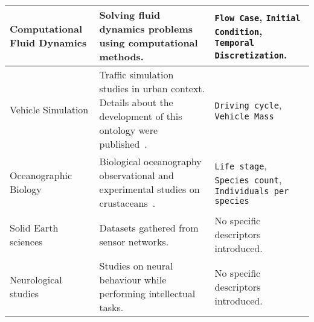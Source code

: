 \begin{table*}
\begin{tabular}{|p{}|p{}|p{}|}
Computational Fluid Dynamics    & Solving fluid dynamics problems using computational methods.                                                        & \texttt{Flow Case}, \texttt{Initial Condition}, \texttt{Temporal Discretization}.                                                                       \\ \hline
Vehicle Simulation              & Traffic simulation studies in urban context. Details about the development of this ontology were published~\cite{AguiarCastro2015}.                                                                        & \texttt{Driving cycle}, \texttt{Vehicle Mass}                                                                                                             \\ \hline
Oceanographic Biology           & Biological oceanography observational and experimental studies on crustaceans~\cite{Rubia2015}.                 & \texttt{Life stage}, \texttt{Species count}, \texttt{Individuals per species}                                                                           \\ \hline
Solid Earth sciences            & Datasets gathered from sensor networks.                                                                             & No specific descriptors introduced.                                                                                                                                        \\ \hline
Neurological studies            & Studies on neural behaviour while performing intellectual tasks.                                                   & No specific descriptors introduced.  \\\hline
\end{tabular}
\end{table*}


